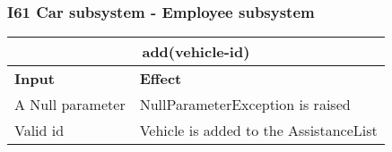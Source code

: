 \subsubsection{I61 Car subsystem - Employee subsystem}
\begin{tabular}{|p{5cm}|p{7cm}|}
\hline
\multicolumn{2}{|c|}{add(vehicle-id)} \\
\hline
\textbf{Input} & \textbf{Effect} \\

\hline
A Null parameter & NullParameterException is raised \\

\hline
Valid id & Vehicle is added to the AssistanceList \\
\hline
\end{tabular}
\\
